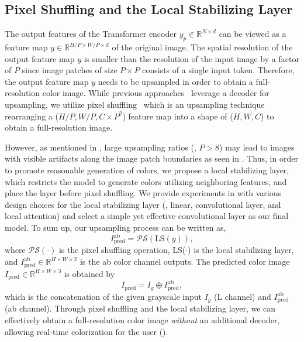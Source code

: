 \documentclass[10pt,twocolumn,letterpaper]{article}
\begin{document}
\subsection{Pixel Shuffling and the Local Stabilizing Layer}
The output features of the Transformer encoder $y_p \in \mathbb{R}^{N\times d}$ can be viewed as a feature map $y \in \mathbb{R}^{H/P \times W/P \times d}$ of the original image. 
The spatial resolution of the output feature map $y$ is smaller than the resolution of the input image by a factor of $P$ since image patches of size $P\times P$ consists of a single input token. 
Therefore, the output feature map $y$ needs to be upsampled in order to obtain a full-resolution color image. 
While previous approaches~\cite{zhang2017, instanceaware} leverage a decoder for upsampling, we utilize pixel shuffling~\cite{pixelshuffle} which is an upsampling technique rearranging a ($H/P, W/P, C\times P^2$) feature map into a shape of ($H, W, C$) to obtain a full-resolution image. 

However, as mentioned in , large upsampling ratios (\eg, $P > 8$) may lead to images with visible artifacts along the image patch boundaries as seen in . 
Thus, in order to promote reasonable generation of colors, we propose a local stabilizing layer, which restricts the model to generate colors utilizing neighboring features, and place the layer before pixel shuffling. 
We provide experiments in  with various design choices for the local stabilizing layer (\eg, linear, convolutional layer, and local attention) and select a simple yet effective convolutional layer as our final model. 
To sum up, our upsampling process can be written as, 
\begin{equation}
    I_{\text{pred}}^{\text{ab}} = \mathcal{PS}(\text{LS}(y)),
\end{equation}
where $\mathcal{PS}(\cdot)$ is the pixel shuffling operation, LS($\cdot$) is the local stabilizing layer, and $I_{\text{pred}}^{\text{ab}} \in \mathbb{R}^{H\times W \times 2}$ is the ab color channel outputs. 
The predicted color image $I_{\text{pred}} \in \mathbb{R}^{H\times W \times 3}$ is obtained by 
\begin{equation*}
    I_{\text{pred}} = I_g \oplus I_{\text{pred}}^{\text{ab}},
\end{equation*}
which is the concatenation of the given grayscale input $I_g$ (L channel)  and $I_{\text{pred}}^{\text{ab}}$ (ab channel). 
Through pixel shuffling and the local stabilizing layer, we can effectively obtain a full-resolution color image \emph{without} an additional decoder, allowing real-time colorization for the user (). 
\end{document}
